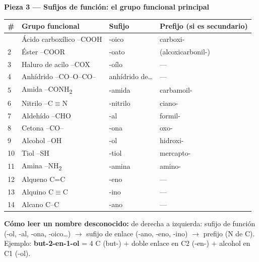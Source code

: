 \vspace{0.4em}
\textbf{Pieza 3 --- Sufijos de función: el grupo funcional principal}

\renewcommand{\arraystretch}{1.3}
\begin{longtable}{C{0.6cm} L{4.2cm} C{2.8cm} C{5.9cm}}
\toprule
\textbf{\#} & \textbf{Grupo funcional} & \textbf{Sufijo} & \textbf{Prefijo (si es secundario)} \\
\midrule\endhead\bottomrule{}  & Ácido carboxílico \mbox{--COOH}         & -oico              & carboxi- \\
2  & Éster \mbox{--COOR}                     & -oato              & (alcoxicarbonil-) \\
3  & Haluro de acilo \mbox{--COX}            & -oílo              & --- \\
4  & Anhídrido \mbox{--CO--O--CO--}          & anhídrido de\ldots & --- \\
5  & Amida \mbox{--CONH\textsubscript{2}}    & -amida             & carbamoil- \\
6  & Nitrilo \mbox{--C$\equiv$N}             & -nitrilo           & ciano- \\
7  & Aldehído \mbox{--CHO}                   & -al                & formil- \\
8  & Cetona \mbox{--CO--}                    & -ona               & oxo- \\
9  & Alcohol \mbox{--OH}                     & -ol                & hidroxi- \\
10 & Tiol \mbox{--SH}                        & -tiol              & mercapto- \\
11 & Amina \mbox{--NH\textsubscript{2}}      & -amina             & amino- \\
12 & Alqueno \mbox{C=C}                      & -eno               & --- \\
13 & Alquino \mbox{C$\equiv$C}               & -ino               & --- \\
14 & Alcano \mbox{C--C}                      & -ano               & --- \\
\end{longtable}

\begin{tcolorbox}[colback=col2, colframe=blueunam, left=4pt, right=4pt, top=4pt, bottom=4pt]
\textbf{Cómo leer un nombre desconocido:} de derecha a izquierda: sufijo de función
(-ol, -al, -ona, -oico\ldots) $\to$ sufijo de enlace (-ano, -eno, -ino) $\to$ prefijo (N de C).\\[4pt]
Ejemplo: \textbf{but-2-en-1-ol} = 4 C (but-) $+$ doble enlace en C2 (-en-) $+$ alcohol en C1 (-ol).
\end{tcolorbox}

